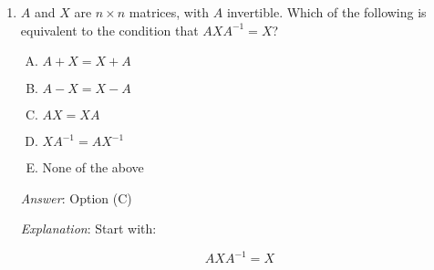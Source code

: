 \documentclass[10pt]{amsart}
\begin{document}
\begin{enumerate}
  \begin{enumerate}[(A)]
  \item $X$ is invertible if and only if $AXA^{-1}$ is invertible.
  \item $X$ is nilpotent if and only if $AXA^{-1}$ is nilpotent.
  \item $X$ is idempotent if and only if $AXA^{-1}$ is idempotent.
  \item All of the above.
  \item None of the above.
  \end{enumerate}

  {\em Answer}: Option (D)

  {\em Explanation}: Essentially, the conjugation operation preserves
  all aspects of the multiplicative structure, hence it preserves the
  properties of being invertible, nilpotent, and idempotent.

  Let us illustrate this with idempotent. We have that:

  $$AX^2A^{-1} = (AXA^{-1})^2$$

  If $X^2 = X$, we get:

  $$AXA^{-1} = (AXA^{-1})^2$$

  showing that $AXA^{-1}$ is also idempotent. We can work backwards to
  show that the reverse implication also holds.

  {\em Performance review}: 14 out of 25 got this. 4 chose (B), 3
  chose (A), 2 chose (D), 1 chose (C), and 1 left the question blank.

  {\em Historical note (last time)}: $18$ out of $26$ got this. $3$ each chose
  (A) and (B), $2$ chose (C).

\item $A$ and $X$ are $n \times n$ matrices, with $A$
  invertible. Which of the following is equivalent to the condition
  that $AXA^{-1} = X$?

  \begin{enumerate}[(A)]
  \item $A + X = X + A$
  \item $A - X = X - A$
  \item $AX = XA$
  \item $XA^{-1} = AX^{-1}$
  \item None of the above
  \end{enumerate}

  {\em Answer}: Option (C)

  {\em Explanation}: Start with:

  $$AXA^{-1} = X$$


\end{enumerate}
\end{document}
